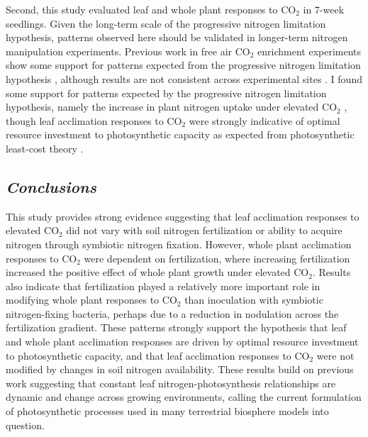 Second, this study evaluated leaf and whole plant responses to CO$_2$ in 7-week seedlings. Given the long-term scale of the progressive nitrogen limitation hypothesis, patterns observed here should be validated in longer-term nitrogen manipulation experiments. Previous work in free air CO$_2$ enrichment experiments show some support for patterns expected from the progressive nitrogen limitation hypothesis , although results are not consistent across experimental sites . I found some support for patterns expected by the progressive nitrogen limitation hypothesis, namely the increase in plant nitrogen uptake under elevated CO$_2$ , though leaf acclimation responses to CO$_2$ were strongly indicative of optimal resource investment to photosynthetic capacity as expected from photosynthetic least-cost theory .


\begin{singlespace}
    \subsection{\textit{Conclusions}}
\end{singlespace}
\noindent This study provides strong evidence suggesting that leaf acclimation responses to elevated CO$_2$ did not vary with soil nitrogen fertilization or ability to acquire nitrogen through symbiotic nitrogen fixation. However, whole plant acclimation responses to CO$_2$ were dependent on fertilization, where increasing fertilization increased the positive effect of whole plant growth under elevated CO$_2$. Results also indicate that fertilization played a relatively more important role in modifying whole plant responses to CO$_2$ than inoculation with symbiotic nitrogen-fixing bacteria, perhaps due to a reduction in nodulation across the fertilization gradient. These patterns strongly support the hypothesis that leaf and whole plant acclimation responses are driven by optimal resource investment to photosynthetic capacity, and that leaf acclimation responses to CO$_2$ were not modified by changes in soil nitrogen availability. These results build on previous work suggesting that constant leaf nitrogen-photosynthesis relationships are dynamic and change across growing environments, calling the current formulation of photosynthetic processes used in many terrestrial biosphere models into question.
